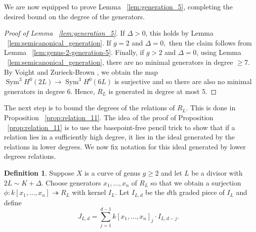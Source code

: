 \documentclass{amsart}
\theoremstyle{plain}
\theoremstyle{definition}
\newtheorem{defn}[thm]{Definition}
\theoremstyle{remark}
\numberwithin{equation}{section}
\DeclareMathOperator{\sym}{Sym}
\begin{document}
We are now equipped to prove Lemma ~\ref{lem:generation_5}, completing the desired bound on the degree of the generators.

\begin{proof}[Proof of Lemma ~\ref{lem:generation_5}]
If $\Delta > 0$, this holds by Lemma ~\ref{lem:semicanonical_generation}. If $g = 2$ and $\Delta = 0,$ then the claim follows from
Lemma ~\ref{lem:genus-2-generation-5}. Finally, if $g > 2$ and $\Delta = 0$, using Lemma ~\ref{lem:semicanonical_generation}, there are no minimal generators in degree $\geq 7$. By Voight and Zurieck-Brown \cite[Theorem 3.2.1]{vzb:stacky}, we obtain the map $\sym^3 H^0(2L) \rightarrow \sym^3 H^0(6L)$ is surjective and so there are also no minimal generators in degree 6. Hence, $R_L$ is generated in degree at most 5.
\end{proof}

The next step is to bound the degrees of the relations of $R_L$. This is done in Proposition ~\ref{prop:relation_11}. The idea of the proof of Proposition ~\ref{prop:relation_11} is to use the basepoint-free pencil trick to show that if a relation lies in a sufficiently high degree, it lies in the ideal generated by the relations in lower degrees. We now fix notation for this ideal generated by lower degrees relations.

\begin{defn}
\label{defn:lower-ideal}
Suppose $X$ is a curve of genus $g \geq 2$ and let $L$ be a divisor with $2L \sim K+\Delta$. Choose generators $x_1, \ldots, x_n$ of $R_L$ so that we obtain a surjection $\phi:k[x_1, \ldots, x_n] \twoheadrightarrow R_L$ with kernel $I_L$. Let $I_{L, d}$ be the $d$th graded piece of $I_L$ and define
\[
	J_{L,d} = \sum_{j = 1}^{d- 1}k[x_1, \ldots, x_n]_j \cdot I_{L,d-j}.
\]
\end{defn}
\end{document}
